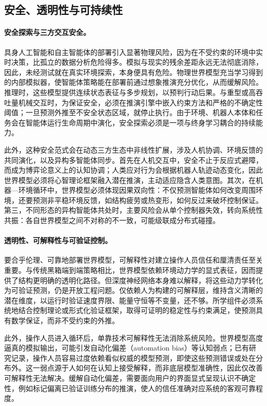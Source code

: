 \subsection{安全、透明性与可持续性}
\paragraph{安全探索与三方交互安全。}
具身人工智能和自主智能体的部署引入显著物理风险，因为在不受约束的环境中实时决策，比孤立的数据分析危险得多。模拟与现实的残余差距永远无法彻底消除，因此，未经测试就在真实环境探索，本身便具有危险\citep{billard2025roadmap}。物理世界模型充当学习得到的内部模拟器，使智能体策略能在部署前通过想象推演充分优化，从而缓解风险。推理时，这些模型提供连续状态表征与多步规划，以预判行动后果。与重型或高吞吐量机械交互时，为保证安全，必须在推演引擎中嵌入约束方法和严格的不确定性阈值；一旦预测外推至不安全状态区域，就停止执行。由于环境、机器人本体和任务会在智能体运行生命周期中演化，安全探索必须是一项与终身学习耦合的持续能力。

此外，这种安全范式会在动态三方生态中非线性扩展，涉及人机协调、环境反馈的共同演化，以及异构多智能体同步。首先在人机交互中，安全不止于反应式避障，而成为博弈论意义上的认知协调；人类应对行为会根据机器人轨迹动态变化，因此世界模型必须将心智理论框架融入潜在推演，主动适应隐含人类意图。其次，在机器—环境循环中，世界模型必须体现因果双向性：不仅预测智能体如何改变周围环境，还要预测非平稳环境反馈，如结构疲劳或热变形，如何反过来破坏控制保证。第三，不同形态的异构智能体共处时，主要风险会从单个控制器失效，转向系统性共振：各自世界模型之间不对称的不一致，可能级联成分布式碰撞。

\paragraph{透明性、可解释性与可验证控制。}
要合乎伦理、可靠地部署世界模型，可解释性对建立操作人员信任和厘清责任至关重要。与传统黑箱端到端策略相比，世界模型依赖环境动力学的显式表征，因而提供了结构更明确的透明化路径。但深度神经网络本身难以解释，将这些动力学转化为可验证预测，仍是开放工程问题。仅依赖人为构建的可解释层，维持含义清晰的潜在维度，以运行时验证速度界限、能量守恒等不变量，还不够。所学组件必须系统地结合控制理论或形式化验证框架，取得可证明的稳定性与约束满足，使预测具有数学保证，而非不受约束的外推。

此外，操作人员进入循环后，单靠技术可解释性无法消除系统风险。世界模型高度逼真的模拟输出，可能引发自动化偏差（automation bias）等认知弱点；已有研究记录，操作人员容易过度依赖看似权威的模型预测，即使这些预测错误或处在分布外\citep{parasuraman1997humans}。这一弱点源于人如何在认知上接受解释，而非底层模型准确性，因此仅改善可解释性无法解决。缓解自动化偏差，需要面向用户的界面显式呈现认识不确定性，例如标记偏离已验证训练分布的推演，使人的信任准确对应系统的客观可靠程度。

